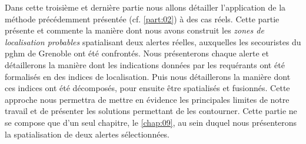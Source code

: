 Dans cette troisième et dernière partie nous allons détailler
l’application de la méthode précédemment présentée
(cf. \autoref{part:02}) à des cas réels. Cette partie présente et
commente la manière dont nous avons construit les \emph{zones de
  localisation probables} spatialisant deux alertes réelles,
auxquelles les secouristes du \ac{pghm} de Grenoble ont été
confrontés. Nous présenterons chaque alerte et détaillerons la manière
dont les indications données par les requérants ont été formalisés en
des indices de localisation. Puis nous détaillerons la manière dont
ces indices ont été décomposés, pour ensuite être spatialisés et
fusionnés. Cette approche nous permettra de mettre en évidence les
principales limites de notre travail et de présenter les solutions
permettant de les contourner. Cette partie ne se compose que d'un seul
chapitre, le \ref{chap:09}, au sein duquel nous présenterons la
spatialisation de deux alertes sélectionnées.

